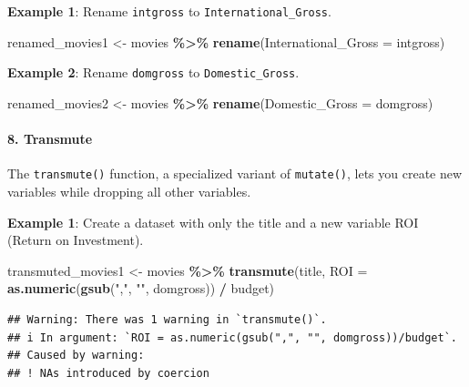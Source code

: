 \documentclass[
  b5paper]{book}
\newenvironment{Shaded}{\begin{snugshade}}{\end{snugshade}}
\newcommand{\AttributeTok}[1]{\textcolor[rgb]{0.13,0.29,0.53}{#1}}
\newcommand{\FunctionTok}[1]{\textcolor[rgb]{0.13,0.29,0.53}{\textbf{#1}}}
\newcommand{\NormalTok}[1]{#1}
\newcommand{\OtherTok}[1]{\textcolor[rgb]{0.56,0.35,0.01}{#1}}
\newcommand{\SpecialCharTok}[1]{\textcolor[rgb]{0.81,0.36,0.00}{\textbf{#1}}}
\newcommand{\StringTok}[1]{\textcolor[rgb]{0.31,0.60,0.02}{#1}}
\begin{document}
\textbf{Example 1}: Rename \texttt{intgross} to \texttt{International\_Gross}.

\begin{Shaded}
\begin{Highlighting}[]
\NormalTok{renamed\_movies1 }\OtherTok{\textless{}{-}}\NormalTok{ movies }\SpecialCharTok{\%\textgreater{}\%}
  \FunctionTok{rename}\NormalTok{(}\AttributeTok{International\_Gross =}\NormalTok{ intgross)}
\end{Highlighting}
\end{Shaded}

\textbf{Example 2}: Rename \texttt{domgross} to \texttt{Domestic\_Gross}.

\begin{Shaded}
\begin{Highlighting}[]
\NormalTok{renamed\_movies2 }\OtherTok{\textless{}{-}}\NormalTok{ movies }\SpecialCharTok{\%\textgreater{}\%}
  \FunctionTok{rename}\NormalTok{(}\AttributeTok{Domestic\_Gross =}\NormalTok{ domgross)}
\end{Highlighting}
\end{Shaded}

\hypertarget{transmute}{%
\paragraph*{8. Transmute}\label{transmute}}

The \texttt{transmute()} function, a specialized variant of \texttt{mutate()}, lets you create new variables while dropping all other variables.

\textbf{Example 1}: Create a dataset with only the title and a new variable ROI (Return on Investment).

\begin{Shaded}
\begin{Highlighting}[]
\NormalTok{transmuted\_movies1 }\OtherTok{\textless{}{-}}\NormalTok{ movies }\SpecialCharTok{\%\textgreater{}\%}
  \FunctionTok{transmute}\NormalTok{(title, }\AttributeTok{ROI =} \FunctionTok{as.numeric}\NormalTok{(}\FunctionTok{gsub}\NormalTok{(}\StringTok{","}\NormalTok{, }\StringTok{""}\NormalTok{, domgross)) }\SpecialCharTok{/}\NormalTok{ budget)}
\end{Highlighting}
\end{Shaded}

\begin{verbatim}
## Warning: There was 1 warning in `transmute()`.
## i In argument: `ROI = as.numeric(gsub(",", "", domgross))/budget`.
## Caused by warning:
## ! NAs introduced by coercion
\end{verbatim}
\end{document}
